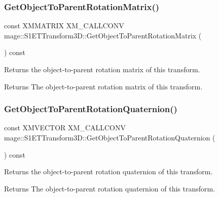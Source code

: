 \subsubsection{\texorpdfstring{Get\+Object\+To\+Parent\+Rotation\+Matrix()}{GetObjectToParentRotationMatrix()}}
{\footnotesize\ttfamily const X\+M\+M\+A\+T\+R\+IX X\+M\+\_\+\+C\+A\+L\+L\+C\+O\+NV mage\+::\+S1\+E\+T\+Transform3\+D\+::\+Get\+Object\+To\+Parent\+Rotation\+Matrix (\begin{DoxyParamCaption}{ }\end{DoxyParamCaption}) const\hspace{0.3cm}{\ttfamily [noexcept]}}

Returns the object-\/to-\/parent rotation matrix of this transform.

\begin{DoxyReturn}{Returns}
The object-\/to-\/parent rotation matrix of this transform. 
\end{DoxyReturn}
\mbox{\label{classmage_1_1_s1_e_t_transform3_d_a07af1c560257a9cdf84ede7e540bed38}} 
\subsubsection{\texorpdfstring{Get\+Object\+To\+Parent\+Rotation\+Quaternion()}{GetObjectToParentRotationQuaternion()}}
{\footnotesize\ttfamily const X\+M\+V\+E\+C\+T\+OR X\+M\+\_\+\+C\+A\+L\+L\+C\+O\+NV mage\+::\+S1\+E\+T\+Transform3\+D\+::\+Get\+Object\+To\+Parent\+Rotation\+Quaternion (\begin{DoxyParamCaption}{ }\end{DoxyParamCaption}) const\hspace{0.3cm}{\ttfamily [noexcept]}}

Returns the object-\/to-\/parent rotation quaternion of this transform.

\begin{DoxyReturn}{Returns}
The object-\/to-\/parent rotation quaternion of this transform. 
\end{DoxyReturn}
\mbox{\label{classmage_1_1_s1_e_t_transform3_d_a07ae1d90ea04dce29b90ef8d2cc35f5b}} 
